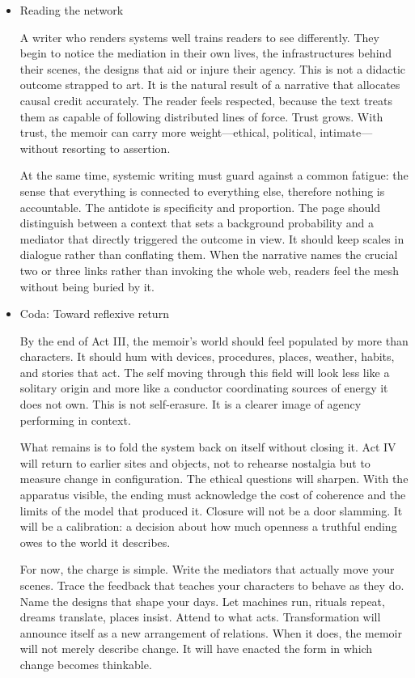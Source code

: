 \documentclass[11pt]{article}
\begin{document}
\begin{itemize}
Reconfiguration also reframes persistence. Not every loop should be broken. Many stabilize life. The ritual that once constrained may later protect. The tool that once distracted may later enable care. The point is not to romanticize stasis but to discriminate between patterns that keep a world alive and patterns that keep it small. Writing at the level of configuration makes such discrimination visible and arguable.
\item Reading the network
\label{sec:org914dcae}

A writer who renders systems well trains readers to see differently. They begin to notice the mediation in their own lives, the infrastructures behind their scenes, the designs that aid or injure their agency. This is not a didactic outcome strapped to art. It is the natural result of a narrative that allocates causal credit accurately. The reader feels respected, because the text treats them as capable of following distributed lines of force. Trust grows. With trust, the memoir can carry more weight—ethical, political, intimate—without resorting to assertion.

At the same time, systemic writing must guard against a common fatigue: the sense that everything is connected to everything else, therefore nothing is accountable. The antidote is specificity and proportion. The page should distinguish between a context that sets a background probability and a mediator that directly triggered the outcome in view. It should keep scales in dialogue rather than conflating them. When the narrative names the crucial two or three links rather than invoking the whole web, readers feel the mesh without being buried by it.
\item Coda: Toward reflexive return
\label{sec:orgb5052b2}

By the end of Act III, the memoir’s world should feel populated by more than characters. It should hum with devices, procedures, places, weather, habits, and stories that act. The self moving through this field will look less like a solitary origin and more like a conductor coordinating sources of energy it does not own. This is not self-erasure. It is a clearer image of agency performing in context.

What remains is to fold the system back on itself without closing it. Act IV will return to earlier sites and objects, not to rehearse nostalgia but to measure change in configuration. The ethical questions will sharpen. With the apparatus visible, the ending must acknowledge the cost of coherence and the limits of the model that produced it. Closure will not be a door slamming. It will be a calibration: a decision about how much openness a truthful ending owes to the world it describes.

For now, the charge is simple. Write the mediators that actually move your scenes. Trace the feedback that teaches your characters to behave as they do. Name the designs that shape your days. Let machines run, rituals repeat, dreams translate, places insist. Attend to what acts. Transformation will announce itself as a new arrangement of relations. When it does, the memoir will not merely describe change. It will have enacted the form in which change becomes thinkable.
\end{itemize}
\end{document}
